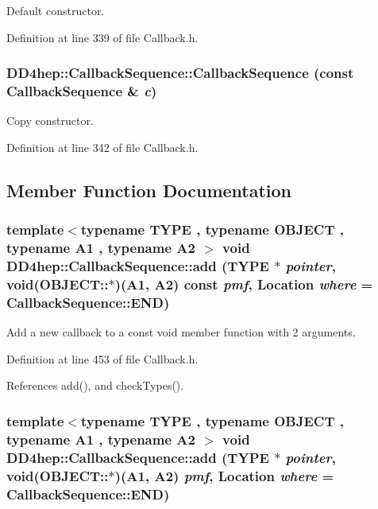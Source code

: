 Default constructor. 

Definition at line 339 of file Callback.h.\hypertarget{struct_d_d4hep_1_1_callback_sequence_a0ab0fc2e4541f1d9ce38cb3f87c29773}{
\subsubsection[{CallbackSequence}]{\setlength{\rightskip}{0pt plus 5cm}DD4hep::CallbackSequence::CallbackSequence (const {\bf CallbackSequence} \& {\em c})}}
\label{struct_d_d4hep_1_1_callback_sequence_a0ab0fc2e4541f1d9ce38cb3f87c29773}


Copy constructor. 

Definition at line 342 of file Callback.h.

\subsection{Member Function Documentation}
\hypertarget{struct_d_d4hep_1_1_callback_sequence_a2a10a126c6b2c0ab9ae1c5925b72b615}{
\subsubsection[{add}]{\setlength{\rightskip}{0pt plus 5cm}template$<$typename TYPE , typename OBJECT , typename A1 , typename A2 $>$ void DD4hep::CallbackSequence::add (TYPE $\ast$ {\em pointer}, \/  void(OBJECT::$\ast$)(A1, A2) const  {\em pmf}, \/  {\bf Location} {\em where} = {\ttfamily CallbackSequence::END})}}
\label{struct_d_d4hep_1_1_callback_sequence_a2a10a126c6b2c0ab9ae1c5925b72b615}


Add a new callback to a const void member function with 2 arguments. 

Definition at line 453 of file Callback.h.

References add(), and checkTypes().\hypertarget{struct_d_d4hep_1_1_callback_sequence_a2eb666ee1a72d56de7100f8fd8742626}{
\subsubsection[{add}]{\setlength{\rightskip}{0pt plus 5cm}template$<$typename TYPE , typename OBJECT , typename A1 , typename A2 $>$ void DD4hep::CallbackSequence::add (TYPE $\ast$ {\em pointer}, \/  void(OBJECT::$\ast$)(A1, A2) {\em pmf}, \/  {\bf Location} {\em where} = {\ttfamily CallbackSequence::END})}}
\label{struct_d_d4hep_1_1_callback_sequence_a2eb666ee1a72d56de7100f8fd8742626}



